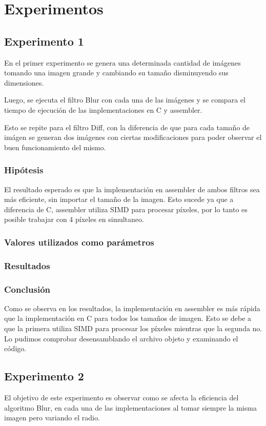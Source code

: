 \section{Experimentos}

	\subsection{Experimento 1}
		En el primer experimento se genera una determinada cantidad de imágenes tomando una imagen grande y cambiando su tamaño disminuyendo sus dimensiones.
	
		Luego, se ejecuta el filtro Blur con cada una de las imágenes y se compara el tiempo de ejecución de las implementaciones en C y assembler.
	
		Esto se repite para el filtro Diff, con la diferencia de que para cada tamaño de imágen se generan dos imágenes con ciertas modificaciones para poder observar el buen funcionamiento del mismo.


	\subsubsection{Hipótesis} 
		El resultado esperado es que la implementación en assembler de ambos filtros sea más eficiente, sin importar el tamaño de la imagen. Esto sucede ya que a diferencia de C, assembler utiliza SIMD para procesar píxeles, por lo tanto es posible trabajar con 4 píxeles en simultaneo.

	\subsubsection{Valores utilizados como parámetros} 

	\subsubsection{Resultados}

	\subsubsection{Conclusión} 
		Como se observa en los resultados, la implementación en assembler es más rápida que la implementación en C para todos los tamaños de imagen. Esto se debe a que la primera utiliza SIMD para procesar los píxeles mientras que la segunda no. Lo pudimos comprobar desensamblando el archivo objeto y examinando el código. 


	\subsection{Experimento 2}
		El objetivo de este experimento es observar como se afecta la eficiencia del algoritmo Blur, en cada una de las implementaciones al tomar siempre la misma imagen pero variando el radio.
	

